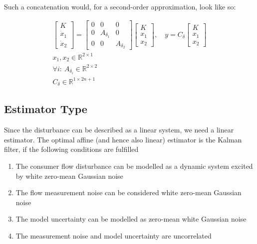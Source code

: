 Such a concatenation would, for a second-order approximation, look like so:

\begin{equation}\label{eq:DisturbanceVectorCase}
	\begin{gathered}
		\begin{bmatrix} K \\ \dot{x}_1 \\ \dot{x}_2 \end{bmatrix} = \begin{bmatrix} 
			0 & 0 & 0 \\
			0 & A_{\delta_1} & 0 \\ 
			0 & 0 & A_{\delta_2}
		\end{bmatrix} \begin{bmatrix} K \\ x_1 \\ x_2 \end{bmatrix},
		\quad y = C_\delta \begin{bmatrix} K \\ x_1 \\ x_2 \end{bmatrix} \\
		x_1, x_2 \in \mathbb{R}^{2\times1} \\
		\forall i: \ A_{\delta_i} \in \mathbb{R}^{2\times2} \\
		C_\delta \in \mathbb{R}^{1\times2n+1}
	\end{gathered}
\end{equation}

\subsection{Estimator Type}
Since the disturbance can be described as a linear system, we need a linear estimator. The optimal affine (and hence also linear) estimator is the Kalman filter, if the following conditions are fulfilled

\begin{enumerate}
	\item The consumer flow disturbance can be modelled as a dynamic system excited by white zero-mean Gaussian noise
	\item The flow measurement noise can be considered white zero-mean Gaussian noise
	\item The model uncertainty can be modelled as zero-mean white Gaussian noise
	\item The measurement noise and model uncertainty are uncorrelated
\end{enumerate}

